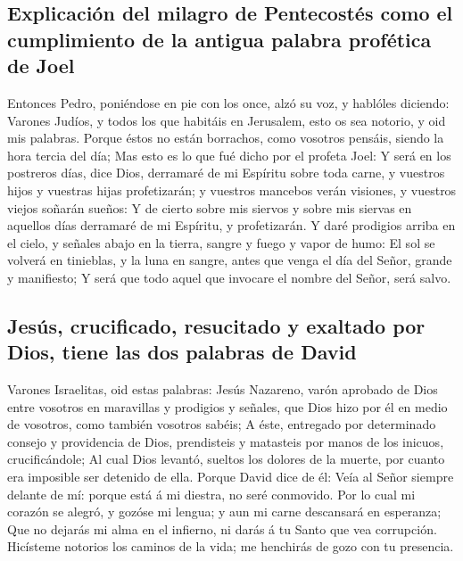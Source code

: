 \hypertarget{explicaciuxf3n-del-milagro-de-pentecostuxe9s-como-el-cumplimiento-de-la-antigua-palabra-profuxe9tica-de-joel}{%
\subsection{Explicación del milagro de Pentecostés como el cumplimiento
de la antigua palabra profética de
Joel}\label{explicaciuxf3n-del-milagro-de-pentecostuxe9s-como-el-cumplimiento-de-la-antigua-palabra-profuxe9tica-de-joel}}

 Entonces Pedro, poniéndose en pie con los once, alzó su
voz, y hablóles diciendo: Varones Judíos, y todos los que habitáis en
Jerusalem, esto os sea notorio, y oid mis palabras. 
Porque éstos no están borrachos, como vosotros pensáis, siendo la hora
tercia del día;  Mas esto es lo que fué dicho por el
profeta Joel:  Y será en los postreros días, dice Dios,
derramaré de mi Espíritu sobre toda carne, y vuestros hijos y vuestras
hijas profetizarán; y vuestros mancebos verán visiones, y vuestros
viejos soñarán sueños:  Y de cierto sobre mis siervos y
sobre mis siervas en aquellos días derramaré de mi Espíritu, y
profetizarán.  Y daré prodigios arriba en el cielo, y
señales abajo en la tierra, sangre y fuego y vapor de humo:
 El sol se volverá en tinieblas, y la luna en sangre,
antes que venga el día del Señor, grande y manifiesto;  Y
será que todo aquel que invocare el nombre del Señor, será salvo.

\hypertarget{jesuxfas-crucificado-resucitado-y-exaltado-por-dios-tiene-las-dos-palabras-de-david}{%
\subsection{Jesús, crucificado, resucitado y exaltado por Dios, tiene
las dos palabras de
David}\label{jesuxfas-crucificado-resucitado-y-exaltado-por-dios-tiene-las-dos-palabras-de-david}}

 Varones Israelitas, oid estas palabras: Jesús Nazareno,
varón aprobado de Dios entre vosotros en maravillas y prodigios y
señales, que Dios hizo por él en medio de vosotros, como también
vosotros sabéis;  A éste, entregado por determinado
consejo y providencia de Dios, prendisteis y matasteis por manos de los
inicuos, crucificándole;  Al cual Dios levantó, sueltos
los dolores de la muerte, por cuanto era imposible ser detenido de ella.
 Porque David dice de él: Veía al Señor siempre delante
de mí: porque está á mi diestra, no seré conmovido.  Por
lo cual mi corazón se alegró, y gozóse mi lengua; y aun mi carne
descansará en esperanza;  Que no dejarás mi alma en el
infierno, ni darás á tu Santo que vea corrupción. 
Hicísteme notorios los caminos de la vida; me henchirás de gozo con tu
presencia.


